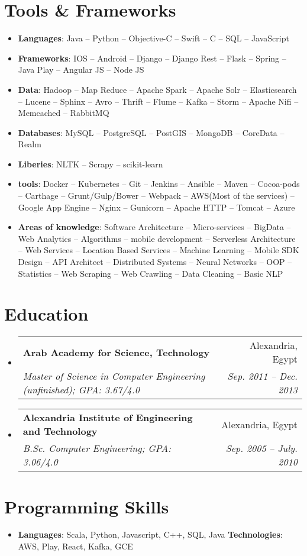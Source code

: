 \documentclass[letterpaper,11pt]{article}
\makeatletter
\newcommand{\resumeItem}[2]{
  \item\small{
    \textbf{#1}{: #2 \vspace{-2pt}}
  }
}
\newcommand{\resumeSubheading}[4]{
  \vspace{-1pt}\item
    \begin{tabular*}{0.97\textwidth}{l@{\extracolsep{\fill}}r}
      \textbf{#1} & #2 \\
      \textit{\small#3} & \textit{\small #4} \\
    \end{tabular*}\vspace{-5pt}
}
\newcommand{\resumeSubHeadingListStart}{\begin{itemize}[leftmargin=*]}
\newcommand{\resumeSubHeadingListEnd}{\end{itemize}}
\makeatother
\begin{document}
\section{Tools \& Frameworks } %

  \resumeSubHeadingListStart
    \resumeItem{Languages}{Java -- Python -- Objective-C -- Swift -- C -- SQL -- JavaScript}
    \resumeItem{Frameworks}{IOS -- Android -- Django -- Django Rest -- Flask -- Spring -- Java Play -- Angular JS -- Node JS}
    \resumeItem{Data}{Hadoop -- Map Reduce -- Apache Spark -- Apache Solr -- Elasticsearch -- Lucene -- Sphinx -- Avro -- Thrift -- Flume -- Kafka -- Storm -- Apache Nifi -- Memcached -- RabbitMQ}
    \resumeItem{Databases}{MySQL -- PostgreSQL -- PostGIS  -- MongoDB -- CoreData -- Realm}
    \resumeItem{Liberies}{NLTK -- Scrapy -- scikit-learn}
    \resumeItem{tools}{Docker -- Kubernetes -- Git -- Jenkins -- Ansible -- Maven -- Cocoa-pods -- Carthage -- Grunt/Gulp/Bower -- Webpack -- AWS(Most of the services) -- Google App Engine -- Nginx -- Gunicorn -- Apache HTTP -- Tomcat -- Azure} 
    \resumeItem{Areas of knowledge}{Software Architecture -- Micro-services -- BigData -- Web Analytics -- Algorithms -- mobile development -- Serverless Architecture -- Web Services -- Location Based Services -- Machine Learning -- Mobile SDK Design -- API Architect -- Distributed Systems -- Neural Networks -- OOP -- Statistics -- Web Scraping -- Web Crawling -- Data Cleaning -- Basic NLP}

  \resumeSubHeadingListEnd

\section{Education}
  \resumeSubHeadingListStart
    \resumeSubheading
      {Arab Academy for Science, Technology}{Alexandria, Egypt}
      {Master of Science in Computer Engineering (unfinished);  GPA: 3.67/4.0}{Sep. 2011 -- Dec. 2013}
    \resumeSubheading
      {Alexandria Institute of Engineering and Technology}{Alexandria, Egypt}
      {B.Sc. Computer Engineering;  GPA: 3.06/4.0}{Sep. 2005 -- July. 2010}
  \resumeSubHeadingListEnd


%
\section{Programming Skills}
 \resumeSubHeadingListStart
   \item{
     \textbf{Languages}{: Scala, Python, Javascript, C++, SQL, Java}
     \hfill
     \textbf{Technologies}{: AWS, Play, React, Kafka, GCE}
   }
 \resumeSubHeadingListEnd


\end{document}
